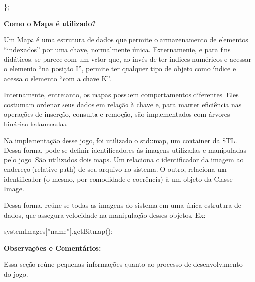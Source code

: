\documentclass[a4paper]{article}
\begin{document}
\textcolor[rgb]{0.7058824,0.7058824,0.7058824}{\};}

\textbf{Como o Mapa é utilizado?}

Um Mapa é uma estrutura de dados que permite o armazenamento de
elementos “indexados” por uma chave, normalmente única. Externamente, e
para fins didáticos, se parece com um vetor que, ao invés de ter
índices numéricos e acessar o elemento “na posição I”, permite ter
qualquer tipo de objeto como índice e acessa o elemento “com a chave
K”.

Internamente, entretanto, os mapas possuem comportamentos diferentes.
Eles costumam ordenar seus dados em relação à chave e, para manter
eficiência nas operações de inserção, consulta e remoção, são
implementados com árvores binárias balanceadas.

Na implementação desse jogo, foi utilizado o std::map, um container da
STL. Dessa forma, pode-se definir identificadores às imagens utilizadas
e manipuladas pelo jogo. São utilizados dois maps. Um relaciona o
identificador da imagem ao endereço (relative-path) de seu arquivo no
sistema. O outro, relaciona um identificador (o mesmo, por comodidade e
coerência) à um objeto da Classe Image.

Dessa forma, reúne-se todas as imagens do sistema em uma única estrutura
de dados, que assegura velocidade na manipulação desses objetos. Ex:

\textcolor[rgb]{0.8392157,0.6156863,0.52156866}{systemImages[}\textcolor[rgb]{0.3372549,0.6117647,0.8392157}{”name”}\textcolor[rgb]{0.8392157,0.6156863,0.52156866}{].}\textcolor[rgb]{0.3254902,0.5058824,0.20784314}{getBitmap}\textcolor[rgb]{0.8392157,0.6156863,0.52156866}{();}


\bigskip


\bigskip


\bigskip

\textbf{Observações e Comentários:}

Essa seção reúne pequenas informações quanto ao processo de
desenvolvimento do jogo.
\end{document}
